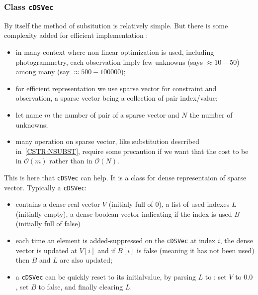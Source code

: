 
\subsubsection{Class {\tt cDSVec} }

By itself the method of subsitution is relatively simple. But there is some complexity added 
for efficient implementation :

\begin{itemize}
    \item  in many context where non linear optimization is used, including photogrammetry,  each observation
           imply few unknowns (says $\approx 10-50$)  among many (say $\approx 500-100000$);

    \item  for efficient representation we use sparse vector for constraint and observation, 
           a sparse vector being a collection of pair index/value;

     \item let name $m$  the number of pair of a sparse vector and $N$ the number of unknowns;

    \item  many operation on sparse vector, like substitution described in~\ref{CSTR:NSUBST}, require some
           precaution if we want that the cost to be in $\mathcal{O}(m)$  rather than in $\mathcal{O}(N)$.
\end{itemize}


This is here that  {\tt cDSVec}  can help. It is a class for dense representaion of sparse vector. Typically a  {\tt cDSVec}:

\begin{itemize}
    \item  contains a dense real vector $V$ (initialy full of $0$), a list of used indexes $L$ (initially empty), a dense boolean
           vector indicating if the index is used $B$ (initially full of false) 
    \item  each time an element is added-suppressed on the {\tt cDSVec} at index $i$, the dense vector is updated 
           at $V[i]$ and if $B[i]$ is false (meaning it has not been used) then $B$ and $L$ are also updated;
    \item  a {\tt cDSVec} can be quickly reset to its initialvalue, by parsing $L$ to : set $V$ to $0.0$, set $B$ to false,
            and finally clearing $L$.
    
\end{itemize}

